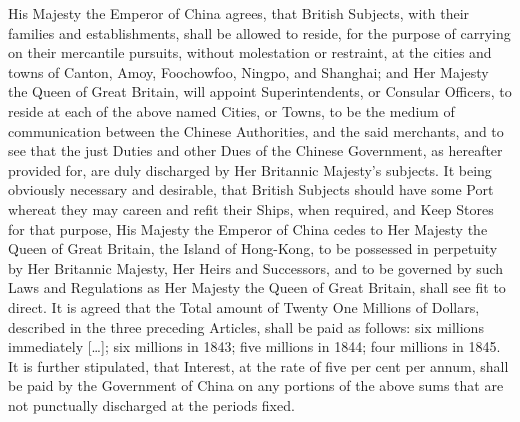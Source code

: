 \begin{fancyquote}
	\vspace*{0.5em}
	\vspace*{0.5em}
	His Majesty the Emperor of China agrees, that British Subjects, with their families and establishments, shall be allowed to reside, for the purpose of carrying on their mercantile pursuits, without molestation or restraint, at the cities and towns of Canton, Amoy, Foochowfoo, Ningpo, and Shanghai; and Her Majesty the Queen of Great Britain, will appoint Superintendents, or Consular Officers, to reside at each of the above named Cities, or Towns, to be the medium of communication between the Chinese Authorities, and the said merchants, and to see that the just Duties and other Dues of the Chinese Government, as hereafter provided for, are duly discharged by Her Britannic Majesty's subjects.
	It being obviously necessary and desirable, that British Subjects should have some Port whereat they may careen and refit their Ships, when required, and Keep Stores for that purpose, His Majesty the Emperor of China cedes to Her Majesty the Queen of Great Britain, the Island of Hong-Kong, to be possessed in perpetuity by Her Britannic Majesty, Her Heirs and Successors, and to be governed by such Laws and Regulations as Her Majesty the Queen of Great Britain, shall see fit to direct.
	It is agreed that the Total amount of Twenty One Millions of Dollars, described in the three preceding Articles, shall be paid as follows: six millions immediately [\ldots]; six millions in 1843; five millions in 1844; four millions in 1845. It is further stipulated, that Interest, at the rate of five per cent per annum, shall be paid by the Government of China on any portions of the above sums that are not punctually discharged at the periods fixed.
	\begin{flushright}
		\autocite{Mayers:1902}
	\end{flushright}
\end{fancyquote}
